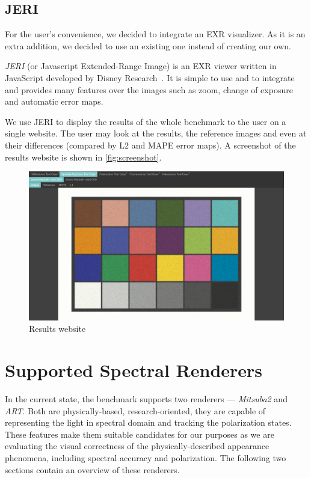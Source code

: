\subsection{JERI}

For the user's convenience, we decided to integrate an EXR visualizer. As it is an extra addition, we decided to use an existing one instead of creating our own.

\emph{JERI} (or Javascript Extended-Range Image) is an EXR viewer written in JavaScript developed by Disney Research~\cite{jeriWeb}. It is simple to use and to integrate and provides many features over the images such as zoom, change of exposure and automatic error maps.

We use JERI to display the results of the whole benchmark to the user on a single website. The user may look at the results, the reference images and even at their differences (compared by L2 and MAPE error maps). A screenshot of the results website is shown in \autoref{fig:screenshot}.

\begin{figure}
	\centering
	\includegraphics[width=\linewidth]{img/screenshot.png}
	\caption{Results website}
	\label{fig:screenshot}
\end{figure}

\section{Supported Spectral Renderers}

In the current state, the benchmark supports two renderers --- \emph{Mitsuba2} and \emph{ART}. Both are physically-based, research-oriented, they are capable of representing the light in spectral domain and tracking the polarization states. These features make them suitable candidates for our purposes as we are evaluating the visual correctness of the physically-described appearance phenomena, including spectral accuracy and polarization. The following two sections contain an overview of these renderers.

